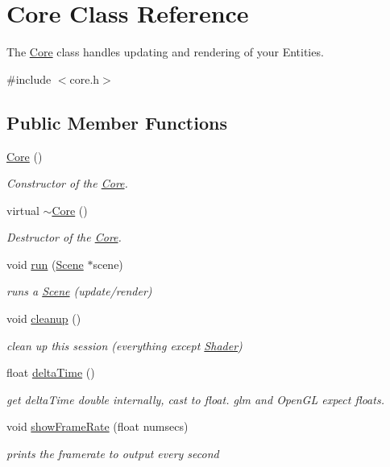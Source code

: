 \hypertarget{class_core}{}\section{Core Class Reference}
\label{class_core}


The \hyperlink{class_core}{Core} class handles updating and rendering of your Entities.  




{\ttfamily \#include $<$core.\+h$>$}

\subsection*{Public Member Functions}
\begin{DoxyCompactItemize}
\item 
\hyperlink{class_core_a14e63188e0aa7c4a6f72d5501384d1f9}{Core} ()
\begin{DoxyCompactList}\small\item\em Constructor of the \hyperlink{class_core}{Core}. \end{DoxyCompactList}\item 
\mbox{\label{class_core_a776f8c46504b14183883c6273f93eaed}} 
virtual \hyperlink{class_core_a776f8c46504b14183883c6273f93eaed}{$\sim$\+Core} ()
\begin{DoxyCompactList}\small\item\em Destructor of the \hyperlink{class_core}{Core}. \end{DoxyCompactList}\item 
void \hyperlink{class_core_aae9e07e9a6ff17ee4d2b5c46858515ab}{run} (\hyperlink{class_scene}{Scene} $\ast$scene)
\begin{DoxyCompactList}\small\item\em runs a \hyperlink{class_scene}{Scene} (update/render) \end{DoxyCompactList}\item 
void \hyperlink{class_core_ab58f3607dfedfe3b24dd2d6c20ed35ba}{cleanup} ()
\begin{DoxyCompactList}\small\item\em clean up this session (everything except \hyperlink{class_shader}{Shader}) \end{DoxyCompactList}\item 
float \hyperlink{class_core_aa10de2c3cab1440c1ee1b1daba0ba3b4}{delta\+Time} ()
\begin{DoxyCompactList}\small\item\em get delta\+Time double internally, cast to float. glm and Open\+GL expect floats. \end{DoxyCompactList}\item 
void \hyperlink{class_core_a82f4706b062ad65b24445bdf6fd6573c}{show\+Frame\+Rate} (float numsecs)
\begin{DoxyCompactList}\small\item\em prints the framerate to output every second \end{DoxyCompactList}\end{DoxyCompactItemize}


